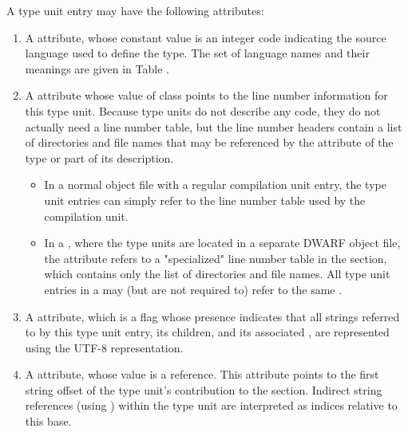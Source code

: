 A type unit entry may have the following attributes:
\begin{enumerate}[1. ]

\item A 
\DWATlanguage{} attribute, 
whose
constant value is an integer code indicating the source
language used to define the type. The set of language names
and their meanings are given in Table .

\item A \DWATstmtlist{} attribute
whose value of class \CLASSlineptr{} points to the line number 
information for this type unit.
Because type units do not describe any code, they
do not actually need a line number table, but the line number
headers contain a list of directories and file names that
may be referenced by the \DWATdeclfile{} attribute of the
type or part of its description. 
\begin{itemize}
\item In a
normal object file with a regular compilation unit entry, the
type unit entries can simply refer to the line number table
used by the compilation unit. 
\item In a \splitDWARFobjectfile, where
the type units are located in a separate DWARF object file,
the \DWATstmtlistNAME{} attribute refers to a "specialized"
line number table in the \dotdebuglinedwo{} section, which
contains only the list of directories and file names. All
type unit entries in a \splitDWARFobjectfile{} may (but are 
not required to) refer to the same 
.
\end{itemize}

\item A \DWATuseUTFeight{} attribute, which is a flag
whose presence indicates that all strings referred to by this type
unit entry, its children, and its associated 
, 
are represented using the UTF-8 representation.

\item A 
\DWATstroffsetsbase{}
attribute, whose value is a reference. This attribute points
to the first string offset of the type unit's contribution to
the \dotdebugstroffsets{} section. Indirect string references
(using \DWFORMstrx) within the type unit are interpreted
as indices relative to this base.

\end{enumerate}

